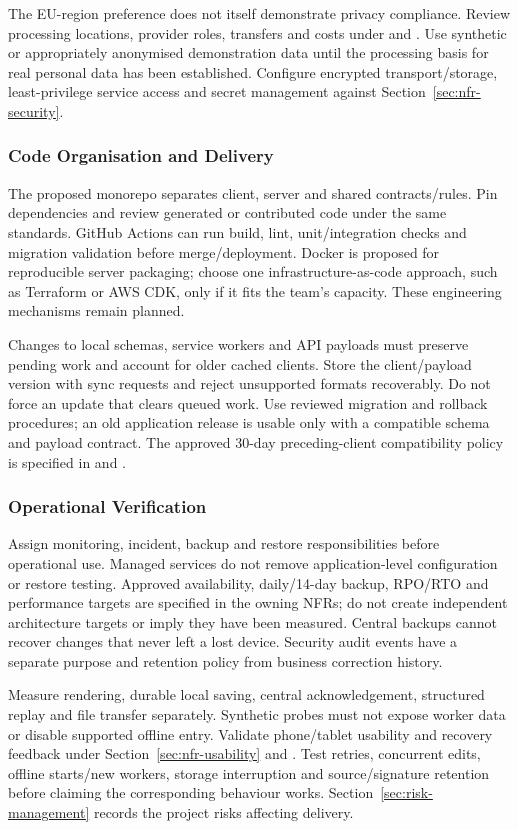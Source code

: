 The EU-region preference does not itself demonstrate privacy compliance. Review
processing locations, provider roles, transfers and costs under
 and . Use synthetic or appropriately
anonymised demonstration data until the processing basis for real personal data
has been established. Configure encrypted transport/storage, least-privilege
service access and secret management against Section~\ref{sec:nfr-security}.

\subsubsection{Code Organisation and Delivery}
The proposed monorepo separates client, server and shared contracts/rules.
Pin dependencies and review generated or contributed code under the same standards.
GitHub Actions can run build, lint, unit/integration checks and migration validation
before merge/deployment. Docker is proposed for reproducible server packaging;
choose one infrastructure-as-code approach, such as Terraform or AWS CDK, only
if it fits the team's capacity. These engineering mechanisms remain planned.

Changes to local schemas, service workers and API payloads must preserve pending
work and account for older cached clients. Store the client/payload version with
sync requests and reject unsupported formats recoverably. Do not force an update
that clears queued work. Use reviewed migration and rollback procedures; an old
application release is usable only with a compatible schema and payload contract.
The approved 30-day preceding-client compatibility policy is specified in  and
.

\subsubsection{Operational Verification}
Assign monitoring, incident, backup and restore responsibilities before operational
use. Managed services do not remove application-level configuration or restore
testing. Approved availability, daily/14-day backup, RPO/RTO and performance
targets are specified in the owning NFRs; do not create independent architecture
targets or imply they have been measured. Central backups cannot recover changes that never left a lost device.
Security audit events have a separate purpose and retention policy from business
correction history.

Measure rendering, durable local saving, central acknowledgement, structured replay
and file transfer separately. Synthetic probes must not expose worker data or
disable supported offline entry. Validate phone/tablet usability and recovery
feedback under Section~\ref{sec:nfr-usability} and . Test
retries, concurrent edits, offline starts/new workers, storage interruption and
source/signature retention before claiming the corresponding behaviour works.
Section~\ref{sec:risk-management} records the project risks affecting delivery.

